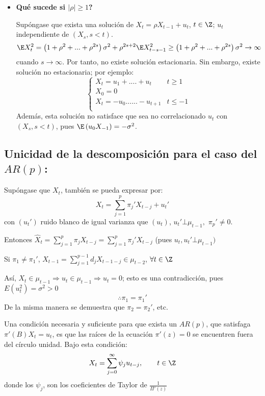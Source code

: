 \begin{itemize}
\item \textbf{Qu\'{e} sucede si $\left| \rho \right|\ge 1$?}

	Sup\'{o}ngase que exista una soluci\'{o}n de $X_{t} =\rho X_{t-1} +u_{t} $, $t\in \Z$; $u_{t} $ independiente de $\left( {X_{s} ,s<t} \right)$.
	\[
	 \E X_{t}^{2} =\left( {1+\rho^{2}+...+\rho^{2s}} \right)\sigma^{2}+\rho ^{2s+2}\E X_{t-s-1}^{2} \ge \left( {1+\rho^{2}+...+\rho^{2s}} \right)\sigma^{2}\to \infty
	\]
	cuando $s\to \infty $. Por tanto, no existe soluci\'{o}n estacionaria. Sin embargo, existe soluci\'{o}n no estacionaria; por ejemplo:
	\[
		\begin{cases}
			 X_{t} =u_{1} +....+u_{t} & t\ge 1 \\ 
			 X_{0} =0 \\ 
			 X_{t} =-u_{0} ......-u_{t+1} & t\le -1 \\ 
		\end{cases}
	\]
	Adem\'{a}s, esta soluci\'{o}n no satisface que sea no correlacionado $u_{t} $ con $(X_{s}, s<t)$, pues $\E\left( {u_{0} X_{-1} } \right)=-\sigma^{2}$.
\end{itemize}

\subsection{Unicidad de la descomposici\'{o}n para el caso del $AR(p)$:}

Sup\'{o}ngase que $X_{t}$, tambi\'{e}n se pueda expresar por:
\[
X_{t} =\sum_{j=1}^p {\pi_{j}' X_{t-j} +u_{t}' } 
\]
con $(u_{t}' )$ ruido blanco de igual varianza que $(u_{t} )$, $u_{t}' \bot \mu_{t-1},$ $\pi_{p}' \ne 0$.\newline 

Entonces $\widehat{{X}}_{t} =\sum_{j=1}^p {\pi_{j} X_{t-j} } =\sum_{j=1}^p {\pi_{j}' X_{t-j} } $ (pues $u_{t} ,u_{t}' \bot \mu_{t-1} )$\newline

Si $\pi_{1} \ne \pi_{1}'$, $X_{t-1} =\sum_{j=1}^{p-1} {d_{j} X_{t-1-j} \in \mu_{t-2} }$, $\forall t\in \Z$\newline

As\'{i}, $X_{t} \in \mu_{t-1} \Rightarrow u_{t} \in \mu_{t-1} \Rightarrow u_{t} =0$; esto es una contradicci\'{o}n, pues $E\left( {u_{t}^{2} } \right)=\sigma^{2}>0$ 
\[
\therefore\pi_{1} =\pi_{1}' 
\]
De la misma manera se demuestra que $\pi_{2} =\pi_{2}'$, etc.

\begin{teorema}
Una condici\'{o}n necesaria y suficiente para que exista un $AR(p)$, que satisfaga $\pi'( B)X_{t} =u_{t} $, es que las ra\'{i}ces de la ecuaci\'{o}n $\pi'( z )=0$ se encuentren fuera del c\'{i}rculo unidad. Bajo esta condici\'{o}n:
\[
X_{t} =\sum_{j=0}^\infty {\psi_{j} u_{t-j} } ,
\qquad
t\in \Z
\]
donde los $\psi_{j} $, son los coeficientes de Taylor de $\frac{1}{\Pi'\left( z \right)}$
\end{teorema}

